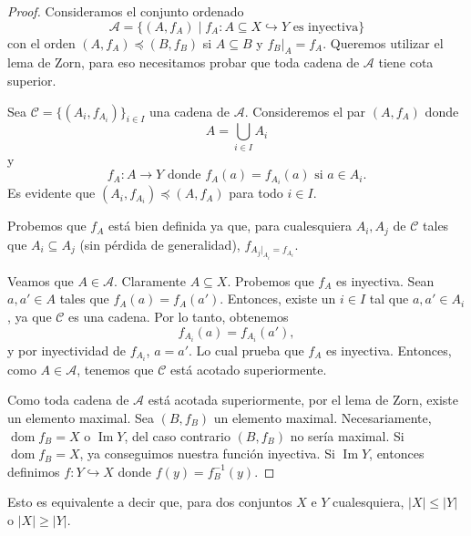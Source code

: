 \begin{proof}
	Consideramos el conjunto ordenado
	\begin{equation*}
		\mathcal{A} = \{ (A, f_{A}) \mid f_{A}: A \subseteq X \hookrightarrow Y  \text{ es inyectiva}\}
	\end{equation*}
	con el orden $(A, f_{A}) \preceq (B, f_{B})$ si $A \subseteq B$ y $f_{B}|_{A} = f_{A}$. Queremos utilizar el lema de Zorn, para eso necesitamos probar que toda cadena de $\mathcal{A}$ tiene cota superior.

	Sea $\mathcal{C} = \{ (A_{i}, f_{A_{i}})\}_{i \in I}$ una cadena de $\mathcal{A}$. Consideremos el par $(A, f_{A})$ donde
	\begin{equation*}
		A = \bigcup_{i \in I} A_{i}
	\end{equation*}
	y
	\begin{equation*}
		f_{A} : A \to Y \text{ donde } f_{A}(a) = f_{A_{i}}(a) \text{ si } a \in A_{i}.
	\end{equation*}
	Es evidente que $(A_{i}, f_{A_{i}}) \preceq (A, f_{A})$ para todo $i \in I$.

	Probemos que $f_{A}$ está bien definida ya que, para cualesquiera $A_{i}, A_{j}$ de $\mathcal{C}$ tales que $A_{i} \subseteq A_{j}$ (sin pérdida de generalidad), $f_{A_{j}|_{A_{i}} = f_{A_{i}}}$.

	Veamos que $A \in \mathcal{A}$. Claramente $A \subseteq X$. Probemos que $f_{A}$ es inyectiva. Sean $a, a' \in A$ tales que $f_{A}(a) = f_{A}(a')$. Entonces, existe un $i \in I$ tal que $a, a' \in A_{i}$, ya que $\mathcal{C}$ es una cadena. Por lo tanto, obtenemos
	\begin{equation*}
		f_{A_{i}}(a) =f_{A_{i}}(a'),
	\end{equation*}
	y por inyectividad de $f_{A_{i}}$, $a = a'$. Lo cual prueba que $f_{A}$ es inyectiva. Entonces, como $A \in \mathcal{A}$, tenemos que $\mathcal{C}$ está acotado superiormente.

	Como toda cadena de $\mathcal{A}$ está acotada superiormente, por el lema de Zorn, existe un elemento maximal. Sea $(B, f_{B})$ un elemento maximal. Necesariamente, $\operatorname{dom} f_{B} = X$ o $\operatorname{Im} Y$, del caso contrario $(B, f_{B})$ no sería maximal. Si $\operatorname{dom} f_{B} = X$, ya conseguimos nuestra función inyectiva. Si $\operatorname{Im} Y$, entonces definimos $f: Y \hookrightarrow X$ donde $f(y) = f_{B}^{-1}(y)$.
\end{proof}

\begin{remark}
	Esto es equivalente a decir que, para dos conjuntos $X$ e $Y$ cualesquiera, $\lvert X \rvert \leq \lvert Y \rvert$ o $\lvert X \rvert \geq \lvert Y \rvert$.
\end{remark}

